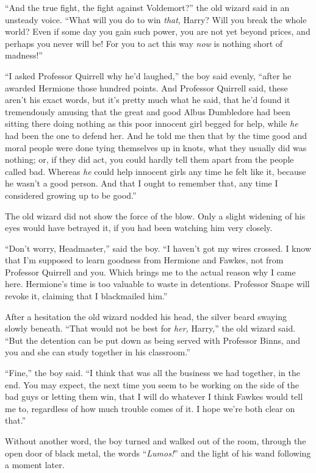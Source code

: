 “And the true fight, the fight against Voldemort?” the old wizard said in an unsteady voice. “What will you do to win \emph{that}, Harry? Will you break the whole world? Even if some day you gain such power, you are not yet beyond prices, and perhaps you never will be! For you to act this way \emph{now} is nothing short of madness!”

“I asked Professor Quirrell why he’d laughed,” the boy said evenly, “after he awarded Hermione those hundred points. And Professor Quirrell said, these aren’t his exact words, but it’s pretty much what he said, that he’d found it tremendously amusing that the great and good Albus Dumbledore had been sitting there doing nothing as this poor innocent girl begged for help, while \emph{he} had been the one to defend her. And he told me then that by the time good and moral people were done tying themselves up in knots, what they usually did was nothing; or, if they did act, you could hardly tell them apart from the people called bad. Whereas \emph{he} could help innocent girls any time he felt like it, because he wasn’t a good person. And that I ought to remember that, any time I considered growing up to be good.”

The old wizard did not show the force of the blow. Only a slight widening of his eyes would have betrayed it, if you had been watching him very closely.

“Don’t worry, Headmaster,” said the boy. “I haven’t got my wires crossed. I know that I’m supposed to learn goodness from Hermione and Fawkes, not from Professor Quirrell and you. Which brings me to the actual reason why I came here. Hermione’s time is too valuable to waste in detentions. Professor Snape will revoke it, claiming that I blackmailed him.”

After a hesitation the old wizard nodded his head, the silver beard swaying slowly beneath. “That would not be best for \emph{her,} Harry,” the old wizard said. “But the detention can be put down as being served with Professor Binns, and you and she can study together in his classroom.”

“Fine,” the boy said. “I think that was all the business we had together, in the end. You may expect, the next time you seem to be working on the side of the bad guys or letting them win, that I will do whatever I think Fawkes would tell me to, regardless of how much trouble comes of it. I hope we’re both clear on that.”

Without another word, the boy turned and walked out of the room, through the open door of black metal, the words “\emph{Lumos!}” and the light of his wand following a moment later.

